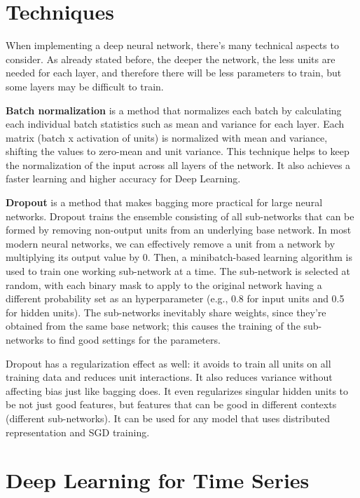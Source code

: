 \section{Techniques}

When implementing a deep neural network, there's many technical aspects to consider. As already stated before, the deeper the network, the less units are needed for each layer, and therefore there will be less parameters to train, but some layers may be difficult to train.

\textbf{Batch normalization} is a method that normalizes each batch by calculating each individual batch statistics such as mean and variance for each layer. Each matrix (batch x activation of units) is normalized with mean and variance, shifting the values to zero-mean and unit variance. This technique helps to keep the normalization of the input across all layers of the network. It also achieves a faster learning and higher accuracy for Deep Learning.

\textbf{Dropout} is a method that makes bagging more practical for large neural networks. Dropout trains the ensemble consisting of all sub-networks that can be formed by removing non-output units from an underlying base network. In most modern neural networks, we can effectively remove a unit from a network by multiplying its output value by 0. Then, a minibatch-based learning algorithm is used to train one working sub-network at a time. The sub-network is selected at random, with each binary mask to apply to the original network having a different probability set as an hyperparameter (e.g., 0.8 for input units and 0.5 for hidden units). The sub-networks inevitably share weights, since they're obtained from the same base network; this causes the training of the sub-networks to find good settings for the parameters.

Dropout has a regularization effect as well: it avoids to train all units on all training data and reduces unit interactions. It also reduces variance without affecting bias just like bagging does. It even regularizes singular hidden units to be not just good features, but features that can be good in different contexts (different sub-networks). It can be used for any model that uses distributed representation and SGD training.

\section{Deep Learning for Time Series}

